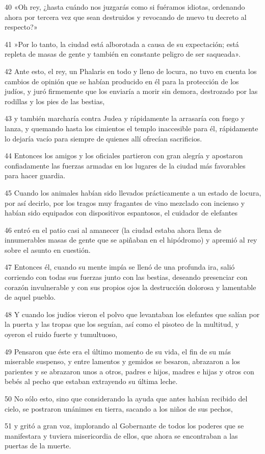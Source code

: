 \par 40 «Oh rey, ¿hasta cuándo nos juzgarás como si fuéramos idiotas, ordenando ahora por tercera vez que sean destruidos y revocando de nuevo tu decreto al respecto?»
\par 41 »Por lo tanto, la ciudad está alborotada a causa de su expectación; está repleta de masas de gente y también en constante peligro de ser saqueada».
\par 42 Ante esto, el rey, un Phalaris en todo y lleno de locura, no tuvo en cuenta los cambios de opinión que se habían producido en él para la protección de los judíos, y juró firmemente que los enviaría a morir sin demora, destrozado por las rodillas y los pies de las bestias,
\par 43 y también marcharía contra Judea y rápidamente la arrasaría con fuego y lanza, y quemando hasta los cimientos el templo inaccesible para él, rápidamente lo dejaría vacío para siempre de quienes allí ofrecían sacrificios.
\par 44 Entonces los amigos y los oficiales partieron con gran alegría y apostaron confiadamente las fuerzas armadas en los lugares de la ciudad más favorables para hacer guardia.
\par 45 Cuando los animales habían sido llevados prácticamente a un estado de locura, por así decirlo, por los tragos muy fragantes de vino mezclado con incienso y habían sido equipados con dispositivos espantosos, el cuidador de elefantes
\par 46 entró en el patio casi al amanecer (la ciudad estaba ahora llena de innumerables masas de gente que se apiñaban en el hipódromo) y apremió al rey sobre el asunto en cuestión.
\par 47 Entonces él, cuando su mente impía se llenó de una profunda ira, salió corriendo con todas sus fuerzas junto con las bestias, deseando presenciar con corazón invulnerable y con sus propios ojos la destrucción dolorosa y lamentable de aquel pueblo.
\par 48 Y cuando los judíos vieron el polvo que levantaban los elefantes que salían por la puerta y las tropas que los seguían, así como el pisoteo de la multitud, y oyeron el ruido fuerte y tumultuoso,
\par 49 Pensaron que éste era el último momento de su vida, el fin de su más miserable suspenso, y entre lamentos y gemidos se besaron, abrazaron a los parientes y se abrazaron unos a otros, padres e hijos, madres e hijas y otros con bebés al pecho que estaban extrayendo su última leche.
\par 50 No sólo esto, sino que considerando la ayuda que antes habían recibido del cielo, se postraron unánimes en tierra, sacando a los niños de sus pechos,
\par 51 y gritó a gran voz, implorando al Gobernante de todos los poderes que se manifestara y tuviera misericordia de ellos, que ahora se encontraban a las puertas de la muerte.

